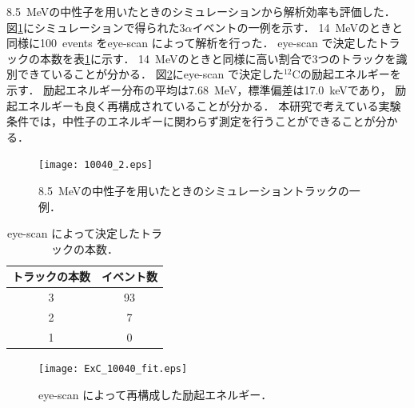 \documentclass[../master]{subfiles}
\begin{document}
\SI{8.5}{\mega\electronvolt}の中性子を用いたときのシミュレーションから解析効率も評価した．
図\ref{fig::three_alpha_low_En}にシミュレーションで得られた3$\alpha$イベントの一例を示す．
\SI{14}{\mega\electronvolt}のときと同様に100~events をeye-scan によって解析を行った．
eye-scan で決定したトラックの本数を表\ref{tab::eye-scan_low}に示す．
\SI{14}{\mega\electronvolt}のときと同様に高い割合で3つのトラックを識別できていることが分かる．
図\ref{fig::ExC_low}にeye-scan で決定した${}^{12}\mathrm{C}$の励起エネルギーを示す．
励起エネルギー分布の平均は\SI{7.68}{\mega\electronvolt}，標準偏差は\SI{17.0}{\kilo\electronvolt}であり，
励起エネルギーも良く再構成されていることが分かる．
本研究で考えている実験条件では，中性子のエネルギーに関わらず測定を行うことができることが分かる．
\begin{figure}
  \centering
  \texttt{[image: 10040\_2.eps]}
  \caption{\SI{8.5}{\mega\electronvolt}の中性子を用いたときのシミュレーショントラックの一例．}
  \label{fig::three_alpha_low_En}
\end{figure}
\begin{table}
  \caption{eye-scan によって決定したトラックの本数．}
  \label{tab::eye-scan_low}
  \centering
  \begin{tabular}{cc}
    \toprule
    トラックの本数 & イベント数 \\
    \midrule
    3 & 93 \\
    2 & 7 \\
    1 & 0 \\
    \bottomrule
  \end{tabular}
\end{table}
\begin{figure}
  \centering
  \texttt{[image: ExC\_10040\_fit.eps]}
  \caption{eye-scan によって再構成した励起エネルギー．}
  \label{fig::ExC_low}
\end{figure}
\end{document}
